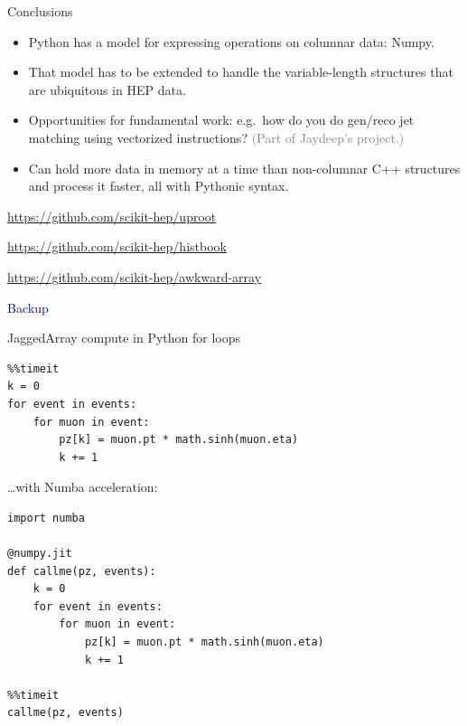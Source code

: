\documentclass[aspectratio=169]{beamer}
\begin{document}
\begin{frame}{Conclusions}
\vspace{0.5 cm}
\large
\begin{itemize}\setlength{\itemsep}{0.5 cm}
\item Python has a model for expressing operations on columnar data: Numpy.
\item That model has to be extended to handle the variable-length structures that are ubiquitous in HEP data.
\item Opportunities for fundamental work: e.g.\ how do you do gen/reco jet matching using vectorized instructions? \textcolor{gray}{(Part of Jaydeep's project.)}
\item Can hold more data in memory at a time than non-columnar C++ structures and process it faster, all with Pythonic syntax.
\end{itemize}

\vspace{0.25 cm}
\begin{center}
\begin{minipage}{0.67\linewidth}
\small
\textcolor{blue}{\url{https://github.com/scikit-hep/uproot}}

\textcolor{blue}{\url{https://github.com/scikit-hep/histbook}}

\textcolor{blue}{\url{https://github.com/scikit-hep/awkward-array}}
\end{minipage}
\end{center}
\end{frame}

\begin{frame}
\huge
\begin{center}
\textcolor{darkblue}{Backup}
\end{center}
\end{frame}

\begin{frame}[fragile]{JaggedArray compute in Python for loops}
\vspace{0.3 cm}
\scriptsize
\begin{verbatim}
%%timeit
k = 0
for event in events:
    for muon in event:
        pz[k] = muon.pt * math.sinh(muon.eta)
        k += 1
\end{verbatim}

\vspace{0.5 cm}
\hfill\begin{minipage}{0.6\linewidth}
{\normalsize \ldots with Numba acceleration:}
\begin{verbatim}
import numba

@numpy.jit
def callme(pz, events):
    k = 0
    for event in events:
        for muon in event:
            pz[k] = muon.pt * math.sinh(muon.eta)
            k += 1

%%timeit
callme(pz, events)
\end{verbatim}
\end{minipage}
\end{frame}
\end{document}
